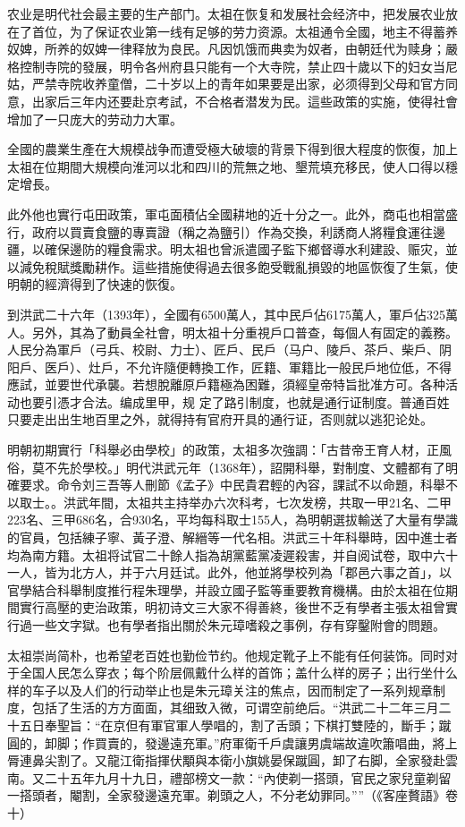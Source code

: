 农业是明代社会最主要的生产部门。太祖在恢复和发展社会经济中，把发展农业放在了首位，为了保证农业第一线有足够的劳力资源。太祖通令全國，地主不得蓄养奴婢，所养的奴婢一律释放为良民。凡因饥饿而典卖为奴者，由朝廷代为赎身；嚴格控制寺院的發展，明令各州府县只能有一个大寺院，禁止四十歲以下的妇女当尼姑，严禁寺院收养童僧，二十岁以上的青年如果要是出家，必须得到父母和官方同意，出家后三年内还要赴京考試，不合格者潜发为民。這些政策的实施，使得社會增加了一只庞大的劳动力大軍。

全國的農業生產在大規模战争而遭受極大破壞的背景下得到很大程度的恢復，加上太祖在位期間大規模向淮河以北和四川的荒無之地、墾荒填充移民，使人口得以穩定增長。

此外他也實行屯田政策，軍屯面積佔全國耕地的近十分之一。此外，商屯也相當盛行，政府以買賣食鹽的專賣證（稱之為鹽引）作為交換，利誘商人將糧食運往邊疆，以確保邊防的糧食需求。明太祖也曾派遣國子監下鄉督導水利建設、赈灾，並以減免稅賦獎勵耕作。這些措施使得過去很多飽受戰亂損毀的地區恢復了生氣，使明朝的經濟得到了快速的恢復。

到洪武二十六年（1393年），全國有6500萬人，其中民戶佔6175萬人，軍戶佔325萬人。另外，其為了動員全社會，明太祖十分重視戶口普查，每個人有固定的義務。人民分為軍戶（弓兵、校尉、力士）、匠戶、民戶（马户、陵戶、茶戶、柴戶、阴阳戶、医戶）、灶戶，不允许隨便轉換工作，匠籍、軍籍比一般民戶地位低，不得應試，並要世代承襲。若想脫離原戶籍極為困難，須經皇帝特旨批准方可。各种活动也要引憑才合法。编成里甲，规 定了路引制度，也就是通行证制度。普通百姓只要走出出生地百里之外，就得持有官府开具的通行证，否则就以逃犯论处。

明朝初期實行「科舉必由學校」的政策，太祖多次強調：「古昔帝王育人材，正風俗，莫不先於學校。」明代洪武元年（1368年），詔開科舉，對制度、文體都有了明確要求。命令刘三吾等人刪節《孟子》中民貴君輕的內容，課試不以命題，科舉不以取士。。洪武年間，太祖共主持举办六次科考，七次发榜，共取一甲21名、二甲223名、三甲686名，合930名，平均每科取士155人，為明朝選拔輸送了大量有學識的官員，包括練子寧、黃子澄、解縉等一代名相。洪武三十年科舉時，因中進士者均為南方籍。太祖将试官二十餘人指為胡黨藍黨凌遲殺害，并自阅试卷，取中六十一人，皆为北方人，并于六月廷试。此外，他並將學校列為「郡邑六事之首」，以官學結合科舉制度推行程朱理學，并設立國子監等重要教育機構。由於太祖在位期間實行高壓的吏治政策，明初诗文三大家不得善終，後世不乏有學者主張太祖曾實行過一些文字獄。也有學者指出關於朱元璋嗜殺之事例，存有穿鑿附會的問題。

太祖崇尚简朴，也希望老百姓也勤俭节约。他规定靴子上不能有任何装饰。同时对于全国人民怎么穿衣；每个阶层佩戴什么样的首饰；盖什么样的房子；出行坐什么样的车子以及人们的行动举止也是朱元璋关注的焦点，因而制定了一系列规章制度，包括了生活的方方面面，其细致入微，可谓空前绝后。“洪武二十二年三月二十五日奉聖旨：“在京但有軍官軍人學唱的，割了舌頭；下棋打雙陸的，斷手；蹴圓的，卸脚；作買賣的，發邊遠充軍。”府軍衛千戶虞讓男虞端故違吹簫唱曲，將上脣連鼻尖割了。又龍江衛指揮伏顒與本衛小旗姚晏保蹴圓，卸了右脚，全家發赴雲南。又二十五年九月十九日，禮部榜文一款：“內使剃一搭頭，官民之家兒童剃留一搭頭者，閹割，全家發邊遠充軍。剃頭之人，不分老幼罪同。””（《客座贅語》卷十）

